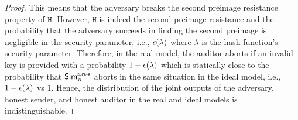 \begin{proof}
This means that the adversary breaks the second preimage resistance property of  $\mathtt{H}$.  However, $\mathtt{H}$ is indeed the second-preimage resistance and the probability that the adversary succeeds in finding the second preimage is negligible in the security parameter, i.e., $\epsilon(\lambda)$ where $\lambda$ is the hash function's security parameter. Therefore, in the real model, the auditor aborts if an invalid key is provided with a probability $1-\epsilon(\lambda)$ which is statically close to the probability that $\mathsf{Sim}^{\scriptscriptstyle \mathtt{ZSPA\text{-}A}}_{\scriptscriptstyle R}$ aborts in the same situation in the ideal model, i.e., $1-\epsilon(\lambda)$ vs $1$. 
Hence, the distribution of the joint outputs of the adversary, honest sender, and honest auditor in the real and ideal models is indistinguishable.
%
%

\end{proof}
